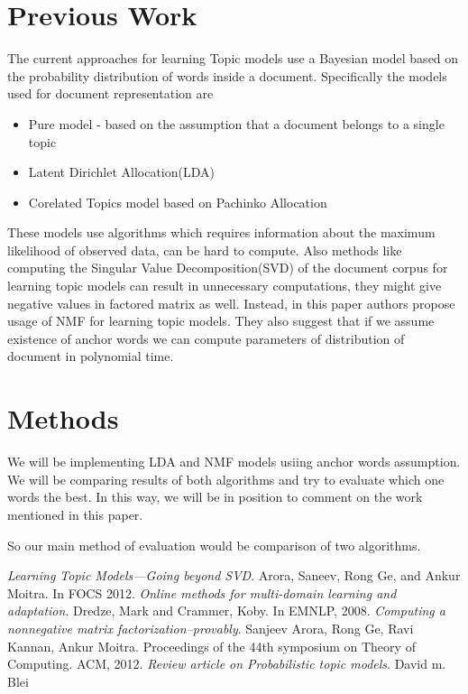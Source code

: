 \documentclass[a4paper,11pt]{article}
\begin{document}
\section{Previous Work}

The current approaches for learning Topic models use a Bayesian model based on the probability distribution of words inside a document{\cite{blei}}. Specifically the models used for document representation are

\begin{itemize} 
\item Pure model - based on the assumption that a document belongs to a single topic
\item Latent Dirichlet Allocation(LDA)
\item Corelated Topics model based on Pachinko Allocation
\end{itemize}
These models use algorithms which requires information about the maximum likelihood of observed data, can be hard to compute. Also methods like computing the Singular Value Decomposition(SVD) of the document corpus for learning topic models can result in unnecessary computations, they might give negative values in factored matrix as well. Instead, in this paper authors propose usage of NMF for learning topic models. They also suggest that if we assume existence of anchor words we can compute parameters of distribution of document in polynomial time. 

\section{Methods}
We will be implementing LDA and NMF models usiing anchor words assumption. We will be comparing results of both algorithms and try to evaluate which one words the best. In this way, we will be in position to comment on the work mentioned in this paper. 

So our main method of evaluation would be comparison of two algorithms. 


\begin{thebibliography}{99}
 \textit{Learning Topic Models---Going beyond SVD}. Arora, Saneev, Rong Ge, and Ankur Moitra. In FOCS 2012.
 \textit{Online methods for multi-domain learning and adaptation}. Dredze, Mark and Crammer, Koby. In
EMNLP, 2008.
 \textit{Computing a nonnegative matrix factorization--provably}. Sanjeev Arora, Rong Ge, Ravi Kannan, Ankur Moitra. Proceedings of the 44th symposium on Theory of Computing. ACM, 2012.  
 \textit{Review article on Probabilistic topic models}. David m. Blei  
\end{thebibliography}




\pagebreak
\end{document}
